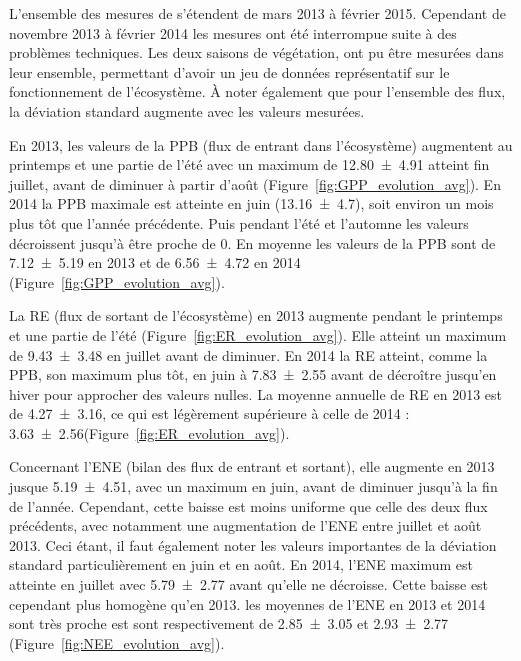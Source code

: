 L'ensemble des mesures de \coo s'étendent de mars 2013 à février 2015.
Cependant de novembre 2013 à février 2014 les mesures ont été interrompue suite à des problèmes techniques.
Les deux saisons de végétation, ont pu être mesurées dans leur ensemble, permettant d'avoir un jeu de données représentatif sur le fonctionnement de l'écosystème.
À noter également que pour l'ensemble des flux, la déviation standard augmente avec les valeurs mesurées.

En 2013, les valeurs de la PPB (flux de \coo entrant dans l'écosystème) augmentent au printemps et une partie de l'été avec un maximum de \SI{12.80(491)}{\uml} atteint fin juillet, avant de diminuer à partir d'août (Figure~\ref{fig:GPP_evolution_avg}).
En 2014 la PPB maximale est atteinte en juin (\SI{13.16(470)}{\uml}), soit environ un mois plus tôt que l'année précédente.
Puis pendant l'été et l'automne les valeurs décroissent jusqu'à être proche de 0.
En moyenne les valeurs de la PPB sont de \SI{7.12(519)}{\uml} en 2013 et de \SI{6.56(472)}{\uml} en 2014 (Figure~\ref{fig:GPP_evolution_avg}).

La RE (flux de \coo sortant de l'écosystème) en 2013 augmente pendant le printemps et une partie de l'été (Figure~\ref{fig:ER_evolution_avg}).
Elle atteint un maximum de \SI{9.43(348)}{\uml} en juillet avant de diminuer.
En 2014 la RE atteint, comme la PPB, son maximum plus tôt, en juin à \SI{7.83(255)}{\uml} avant de décroître jusqu'en hiver pour approcher des valeurs nulles.
La moyenne annuelle de RE en 2013 est de \SI{4.27(316)}{\uml}, ce qui est légèrement supérieure à celle de 2014 : \SI{3.63(256)}{\uml}(Figure~\ref{fig:ER_evolution_avg}).

Concernant l'ENE (bilan des flux de \coo entrant et sortant), elle augmente en 2013 jusque \SI{5.19(451)}{\uml}, avec un maximum en juin, avant de diminuer jusqu'à la fin de l'année.
Cependant, cette baisse est moins uniforme que celle des deux flux précédents, avec notamment une augmentation de l'ENE entre juillet et août 2013.
Ceci étant, il faut également noter les valeurs importantes de la déviation standard particulièrement en juin et en août.
En 2014, l'ENE maximum est atteinte en juillet avec \SI{5.79(277)}{\uml} avant qu'elle ne décroisse.
Cette baisse est cependant plus homogène qu'en 2013.
les moyennes de l'ENE en 2013 et 2014 sont très proche est sont respectivement de \SI{2.85(305)}{\uml} et \SI{2.93(277)}{\uml} (Figure~\ref{fig:NEE_evolution_avg}).

